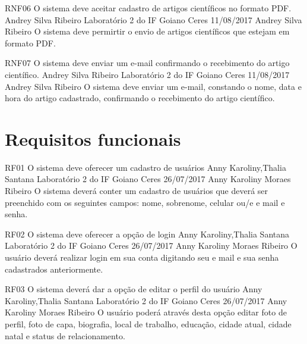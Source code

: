    \requisitoNaoFuncional
 {RNF06}
 {O sistema deve aceitar cadastro de artigos científicos no formato PDF.}
 {Andrey Silva Ribeiro}
 {Laboratório 2 do IF Goiano Ceres}
 {11/08/2017}
 {Andrey Silva Ribeiro}
 {O sistema deve permirtir o envio de artigos científicos que estejam em formato PDF.
 }
 
    \requisitoNaoFuncional
 {RNF07}
 {O sistema deve enviar um e-mail confirmando o recebimento do artigo científico.}
 {Andrey Silva Ribeiro}
 {Laboratório 2 do IF Goiano Ceres}
 {11/08/2017}
 {Andrey Silva Ribeiro}
 {O sistema deve enviar um e-mail, constando o nome, data e hora do artigo cadastrado, confirmando o recebimento do artigo científico.
 }

 \section{Requisitos funcionais}
 	
 \requisitoFuncional
 {RF01}
 {O sistema deve oferecer um cadastro de usuários}
 {Anny Karoliny,Thalia Santana}
 {Laboratório 2 do IF Goiano Ceres}
 {26/07/2017}
 {Anny Karoliny Moraes Ribeiro}
 {O sistema deverá conter um cadastro de usuários que deverá ser preenchido com os seguintes campos: nome, sobrenome, celular ou/e e mail e senha.
 }
 
 \requisitoFuncional
 {RF02}
 {O sistema deve oferecer a opção de login}
 {Anny Karoliny,Thalia Santana}
 {Laboratório 2 do IF Goiano Ceres}
 {26/07/2017}
 {Anny Karoliny Moraes Ribeiro}
 {O usuário deverá realizar login em sua conta digitando seu e mail e sua senha cadastrados anteriormente.
 }
 
 \requisitoFuncional
 {RF03}
 {O sistema deverá dar a opção de editar o perfil do usuário}
 {Anny Karoliny,Thalia Santana}
 {Laboratório 2 do IF Goiano Ceres}
 {26/07/2017}
 {Anny Karoliny Moraes Ribeiro}
 {O usuário poderá através desta opção editar  foto de perfil, foto de capa, biografia, local de trabalho, educação, cidade atual, cidade natal e status de relacionamento.
 }
 
